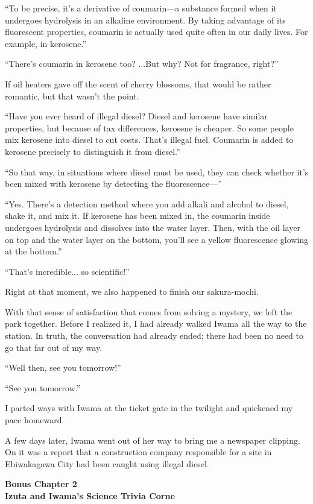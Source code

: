 \documentclass[
    a4paper,
    12pt,
    twoside,
    openany,
    UTF8,
    fontset=windows
]{ctexbook}
\begin{document}
``To be precise, it's a derivative of coumarin---a substance formed when it undergoes hydrolysis in an alkaline environment. By taking advantage of its fluorescent properties, coumarin is actually used quite often in our daily lives. For example, in kerosene.''

``There's coumarin in kerosene too? ...But why? Not for fragrance, right?''

If oil heaters gave off the scent of cherry blossoms, that would be rather romantic, but that wasn't the point.

``Have you ever heard of illegal diesel? Diesel and kerosene have similar properties, but because of tax differences, kerosene is cheaper. So some people mix kerosene into diesel to cut costs. That's illegal fuel. Coumarin is added to kerosene precisely to distinguish it from diesel.''

``So that way, in situations where diesel must be used, they can check whether it's been mixed with kerosene by detecting the fluorescence---''

``Yes. There's a detection method where you add alkali and alcohol to diesel, shake it, and mix it. If kerosene has been mixed in, the coumarin inside undergoes hydrolysis and dissolves into the water layer. Then, with the oil layer on top and the water layer on the bottom, you'll see a yellow fluorescence glowing at the bottom.''

``That's incredible... so scientific!''

Right at that moment, we also happened to finish our sakura-mochi.

With that sense of satisfaction that comes from solving a mystery, we left the park together. Before I realized it, I had already walked Iwama all the way to the station. In truth, the conversation had already ended; there had been no need to go that far out of my way.

``Well then, see you tomorrow!''

``See you tomorrow.''

I parted ways with Iwama at the ticket gate in the twilight and quickened my pace homeward.

A few days later, Iwama went out of her way to bring me a newspaper clipping. On it was a report that a construction company responsible for a site in Ebiwakagawa City had been caught using illegal diesel.

\clearpage
\thispagestyle{plain}
\begin{center}
    \large\bfseries
    Bonus Chapter 2\\
        Izuta and Iwama's Science Trivia Corne
\end{center}
\label{sec:b}
\vspace{1cm}
\end{document}
